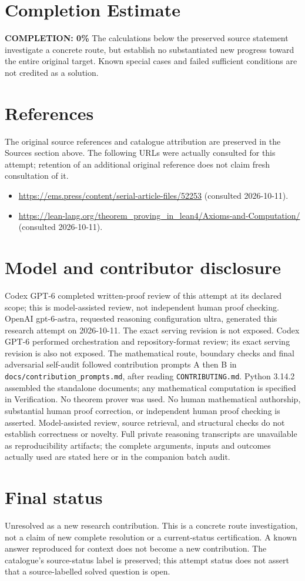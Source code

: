 \documentclass[11pt]{article}
\begin{document}
\section{Completion Estimate}
\noindent\textbf{COMPLETION: 0\%}
The calculations below the preserved source statement investigate a concrete route,
but establish no substantiated new progress toward the entire original target.
Known special cases and failed sufficient conditions are not credited as a solution.
\section{References}
The original source references and catalogue attribution are preserved in the
Sources section above. The following URLs were actually consulted for this attempt;
retention of an additional original reference does not claim fresh consultation of it.
\begin{itemize}
\item \url{https://ems.press/content/serial-article-files/52253} (consulted 2026-10-11). 
\item \url{https://lean-lang.org/theorem_proving_in_lean4/Axioms-and-Computation/} (consulted 2026-10-11). 
\end{itemize}
\section{Model and contributor disclosure}
Codex GPT-6 completed written-proof review of this attempt at its declared scope; this is model-assisted review, not independent human proof checking.
OpenAI gpt-6-astra, requested reasoning configuration ultra, generated this research
attempt on 2026-10-11. The exact serving revision is not exposed. Codex GPT-6
performed orchestration and repository-format review; its exact serving revision
is also not exposed. The mathematical route, boundary checks and final adversarial
self-audit followed contribution prompts A then B in
\texttt{docs/contribution\_prompts.md}, after reading \texttt{CONTRIBUTING.md}.
Python 3.14.2 assembled the standalone documents; any mathematical computation is
specified in Verification. No theorem prover was used. No human mathematical
authorship, substantial human proof correction, or independent human proof checking
is asserted. Model-assisted review, source retrieval, and structural checks do not
establish correctness or novelty. Full private reasoning transcripts are unavailable
as reproducibility artifacts; the complete arguments, inputs and outcomes actually
used are stated here or in the companion batch audit.
\section{Final status}
Unresolved as a new research contribution. This is a concrete route investigation,
not a claim of new complete resolution or a current-status certification. A known
answer reproduced for context does not become a new contribution. The catalogue's
source-status label is preserved; this attempt status does not assert that a
source-labelled solved question is open.
\end{document}
